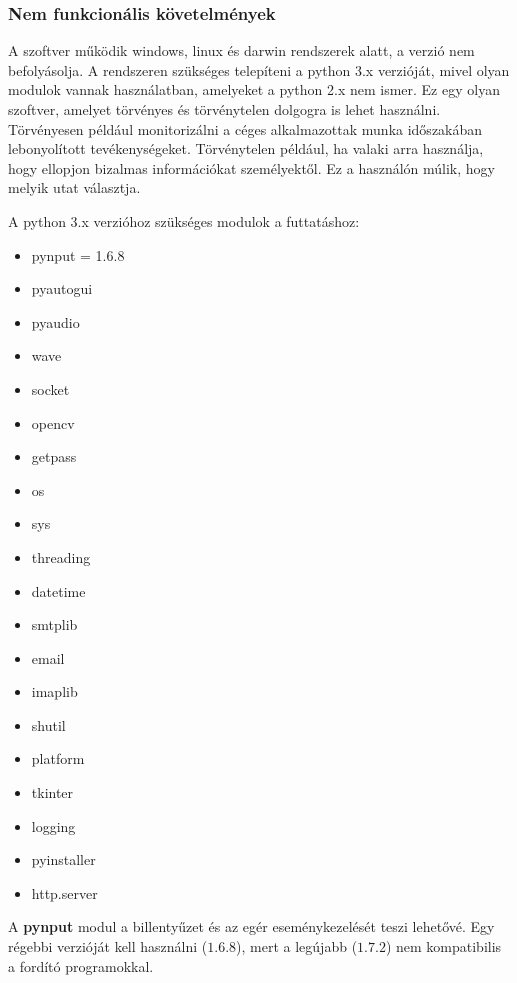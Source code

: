 \documentclass[a4paper, 11pt]{article}
\begin{document}

\subsubsection{Nem funkcionális követelmények}
A szoftver működik windows, linux és darwin rendszerek alatt, a verzió nem befolyásolja. A rendszeren szükséges telepíteni a python 3.x verzióját, mivel olyan modulok vannak használatban, amelyeket a python 2.x nem ismer. Ez egy olyan szoftver, amelyet törvényes és törvénytelen dolgogra is lehet használni. Törvényesen például monitorizálni a céges alkalmazottak munka időszakában lebonyolított tevékenységeket. Törvénytelen például, ha valaki arra használja, hogy ellopjon bizalmas információkat személyektől. Ez a használón múlik, hogy melyik utat választja.

A python 3.x verzióhoz szükséges modulok a futtatáshoz:
\begin{multicols}{2}
\begin{itemize}
\item pynput = 1.6.8
\item pyautogui
\item pyaudio
\item wave
\item socket
\item opencv
\item getpass
\item os
\item sys
\item threading
\item datetime
\item smtplib
\item email
\item imaplib
\item shutil
\item platform
\item tkinter
\item logging
\item pyinstaller
\item http.server
\end{itemize}
\end{multicols}
A \textbf{pynput} modul a billentyűzet és az egér eseménykezelését teszi lehetővé. Egy régebbi verzióját kell használni ($1.6.8$), mert a legújabb ($1.7.2$) nem kompatibilis a fordító programokkal.
\end{document}
